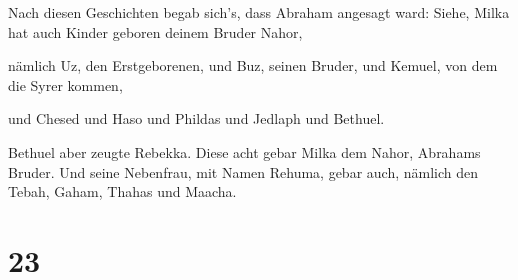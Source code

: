  Nach diesen Geschichten begab sich's, dass Abraham
angesagt ward: Siehe, Milka hat auch Kinder geboren deinem Bruder Nahor,

 nämlich Uz, den Erstgeborenen, und Buz, seinen Bruder,
und Kemuel, von dem die Syrer kommen,

 und Chesed und Haso und Phildas und Jedlaph und Bethuel.

 Bethuel aber zeugte Rebekka. Diese acht gebar Milka dem
Nahor, Abrahams Bruder.  Und seine Nebenfrau, mit Namen
Rehuma, gebar auch, nämlich den Tebah, Gaham, Thahas und Maacha.

\hypertarget{section-22}{%
\section{23}\label{section-22}}

